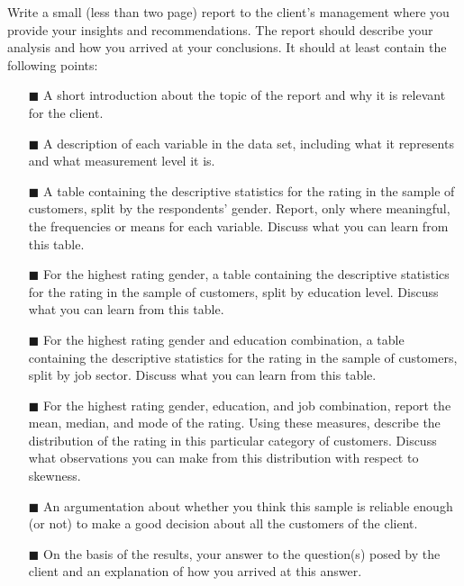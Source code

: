 Write a small (less than two page) report to the client's management where you provide your insights and recommendations. The report should describe your analysis and how you arrived at your conclusions. It should at least contain the following points: \\

\begin{itemize}
    \item[$\blacksquare$] A short introduction about the topic of the report and why it is relevant for the client.
    \item[$\blacksquare$] A description of each variable in the data set, including what it represents and what measurement level it is. 
    \item[$\blacksquare$] A table containing the descriptive statistics for the rating in the sample of customers, split by the respondents' gender. Report, only where meaningful, the frequencies or means for each variable. Discuss what you can learn from this table. 
    \item[$\blacksquare$] For the highest rating gender, a table containing the descriptive statistics for the rating in the sample of customers, split by education level. Discuss what you can learn from this table. 
    \item[$\blacksquare$] For the highest rating gender and education combination, a table containing the descriptive statistics for the rating in the sample of customers, split by job sector. Discuss what you can learn from this table. 
    \item[$\blacksquare$] For the highest rating gender, education, and job combination, report the mean, median, and mode of the rating. Using these measures, describe the distribution of the rating in this particular category of customers. Discuss what observations you can make from this distribution with respect to skewness. 
    \item[$\blacksquare$] An argumentation about whether you think this sample is reliable enough (or not) to make a good decision about all the customers of the client.
    \item[$\blacksquare$] On the basis of the results, your answer to the question(s) posed by the client and an explanation of how you arrived at this answer.
\end{itemize}

\clearpage %